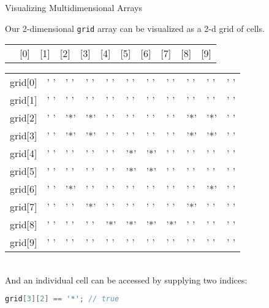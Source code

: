 \documentclass{beamer}
\begin{document}
\begin{frame}[fragile]{Visualizing Multidimensional Arrays}


Our 2-dimensional {\tt grid} array can be visualized as a 2-d grid of cells.\\
\vspace{.1in}
\begin{tabular}{p{.4in}p{.2in}p{.2in}p{.2in}p{.2in}p{.2in}p{.2in}p{.2in}p{.2in}p{.2in}p{.2in}}
         & [0] & [1] & [2] & [3] & [4] & [5] & [6] & [7] & [8] & [9]
\end{tabular}
\begin{tabular}{p{.4in}|p{.2in}|p{.2in}|p{.2in}|p{.2in}|p{.2in}|p{.2in}|p{.2in}|p{.2in}|p{.2in}|p{.2in}|}\cline{2-11}
grid[0] & ' ' & ' ' & ' ' & ' ' & ' ' & ' ' & ' ' & ' ' & ' ' & ' ' \\
\cline{2-11}
grid[1] & ' ' & ' ' & ' ' & ' ' & ' ' & ' ' & ' ' & ' ' & ' ' & ' ' \\
\cline{2-11}
grid[2] & ' ' & '*' & '*' & ' ' & ' ' & ' ' & ' ' & '*' & '*' & ' ' \\
\cline{2-11}
grid[3] & ' ' & '*' & \cellcolor{yellow}'*' & ' ' & ' ' & ' ' & ' ' & '*' & '*' & ' ' \\
\cline{2-11}
grid[4] & ' ' & ' ' & ' ' & ' ' & '*' & '*' & ' ' & ' ' & ' ' & ' ' \\
\cline{2-11}
grid[5] & ' ' & ' ' & ' ' & ' ' & '*' & '*' & ' ' & ' ' & ' ' & ' ' \\
\cline{2-11}
grid[6] & ' ' & '*' & ' ' & ' ' & ' ' & ' ' & ' ' & ' ' & '*' & ' ' \\
\cline{2-11}
grid[7] & ' ' & ' ' & '*' & ' ' & ' ' & ' ' & ' ' & '*' & ' ' & ' ' \\
\cline{2-11}
grid[8] & ' ' & ' ' & ' ' & '*' & '*' & '*' & '*' & ' ' & ' ' & ' ' \\
\cline{2-11}
grid[9] & ' ' & ' ' & ' ' & ' ' & ' ' & ' ' & ' ' & ' ' & ' ' & ' ' \\
\cline{2-11}
\end{tabular}\\
\vspace{.1in}
And an individual cell can be accessed by supplying two indices:

\begin{lstlisting}[language=Java]
grid[3][2] == '*'; // true
\end{lstlisting}

\end{frame}
\end{document}
